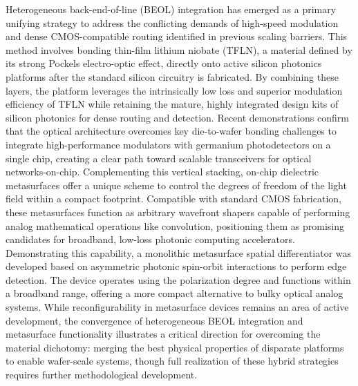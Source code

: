 \documentclass[11pt]{article}
\begin{document}
Heterogeneous back-end-of-line (BEOL) integration has emerged as a primary unifying strategy to address the conflicting demands of high-speed modulation and dense CMOS-compatible routing identified in previous scaling barriers. This method involves bonding thin-film lithium niobate (TFLN), a material defined by its strong Pockels electro-optic effect, directly onto active silicon photonics platforms after the standard silicon circuitry is fabricated. \citep{s2_9b444e84d20ae6e3d62d2d4df30268b5a53baad2_40af2cc9} By combining these layers, the platform leverages the intrinsically low loss and superior modulation efficiency of TFLN while retaining the mature, highly integrated design kits of silicon photonics for dense routing and detection. Recent demonstrations confirm that the optical architecture overcomes key die-to-wafer bonding challenges to integrate high-performance modulators with germanium photodetectors on a single chip, creating a clear path toward scalable transceivers for optical networks-on-chip. Complementing this vertical stacking, on-chip dielectric metasurfaces offer a unique scheme to control the degrees of freedom of the light field within a compact footprint. Compatible with standard CMOS fabrication, these metasurfaces function as arbitrary wavefront shapers capable of performing analog mathematical operations like convolution, positioning them as promising candidates for broadband, low-loss photonic computing accelerators. Demonstrating this capability, a monolithic metasurface spatial differentiator was developed based on asymmetric photonic spin-orbit interactions to perform edge detection. The device operates using the polarization degree and functions within a broadband range, offering a more compact alternative to bulky optical analog systems. \citep{doi_10_1515_nanoph_2020_0366_58f1aa1d} While reconfigurability in metasurface devices remains an area of active development, the convergence of heterogeneous BEOL integration and metasurface functionality illustrates a critical direction for overcoming the material dichotomy: merging the best physical properties of disparate platforms to enable wafer-scale systems, though full realization of these hybrid strategies requires further methodological development. \citep{s2_9b444e84d20ae6e3d62d2d4df30268b5a53baad2_40af2cc9} \citep{doi_10_1515_nanoph_2022_0294_1bd118d5}
\end{document}
